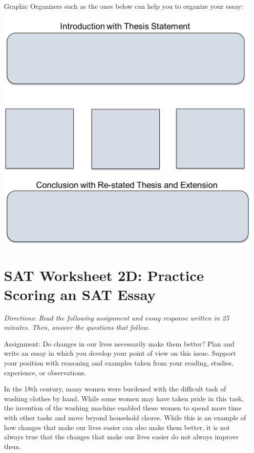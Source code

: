 \documentclass[12pt]{book}
\renewcommand{\indent}{\hspace{1cm}}
\begin{document}
\newpage
Graphic Organizers such as the ones below can help you to organize your essay:

\includegraphics[width=\textwidth]{Organizer}

\section[Scoring]{SAT Worksheet 2D: Practice Scoring an SAT Essay}
\textit{Directions: Read the following assignment and essay response written in 25 minutes. Then, answer the questions that follow.}

\bigskip
Assignment: Do changes in our lives necessarily make them better? Plan and write an essay in which you develop your point of view on this issue.  Support your position with reasoning and examples taken from your reading, studies, experience, or observations.

\bigskip
\indent In the 18th century, many women were burdened with the difficult task of washing clothes by hand. While some women may have taken pride in this task, the invention of the washing machine enabled these women to spend more time with other tasks and move beyond household chores. While this is an example of how changes that make our lives easier can also make them better, it is not always true that the changes that make our lives easier do not always improve them.\\
\end{document}
